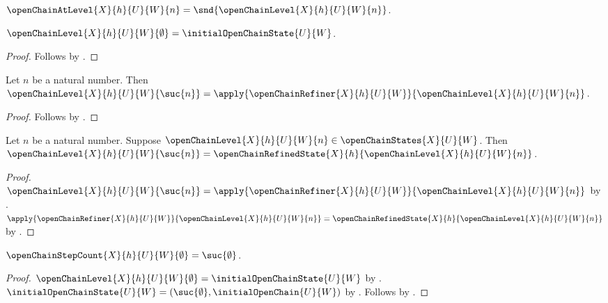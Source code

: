 \begin{definition}\label{open_chain_at_level}
    $\openChainAtLevel{X}{h}{U}{W}{n}=
        \snd{\openChainLevel{X}{h}{U}{W}{n}}$.
\end{definition}

\begin{corollary}\label{open_chain_levels_zero}
    $\openChainLevel{X}{h}{U}{W}{\emptyset}
        =\initialOpenChainState{U}{W}$.
\end{corollary}
\begin{proof}
    Follows by
        .
\end{proof}

\begin{corollary}\label{open_chain_levels_successor_apply}
    Let $n$ be a natural number.
    Then $\openChainLevel{X}{h}{U}{W}{\suc{n}}
        =\apply{\openChainRefiner{X}{h}{U}{W}}
            {\openChainLevel{X}{h}{U}{W}{n}}$.
\end{corollary}
\begin{proof}
    Follows by
        .
\end{proof}

\begin{corollary}\label{open_chain_levels_successor}
    Let $n$ be a natural number.
    Suppose $\openChainLevel{X}{h}{U}{W}{n}
        \in\openChainStates{X}{U}{W}$.
    Then $\openChainLevel{X}{h}{U}{W}{\suc{n}}
        =\openChainRefinedState{X}{h}
            {\openChainLevel{X}{h}{U}{W}{n}}$.
\end{corollary}
\begin{proof}
    $\openChainLevel{X}{h}{U}{W}{\suc{n}}
        =\apply{\openChainRefiner{X}{h}{U}{W}}
            {\openChainLevel{X}{h}{U}{W}{n}}$
        by .
    $\apply{\openChainRefiner{X}{h}{U}{W}}
            {\openChainLevel{X}{h}{U}{W}{n}}
        =\openChainRefinedState{X}{h}
            {\openChainLevel{X}{h}{U}{W}{n}}$
        by .
\end{proof}

\begin{corollary}\label{open_chain_step_count_zero}
    $\openChainStepCount{X}{h}{U}{W}{\emptyset}
        =\suc{\emptyset}$.
\end{corollary}
\begin{proof}
    $\openChainLevel{X}{h}{U}{W}{\emptyset}
        =\initialOpenChainState{U}{W}$
        by .
    $\initialOpenChainState{U}{W}
        =(\suc{\emptyset},\initialOpenChain{U}{W})$
        by .
    Follows by .
\end{proof}

